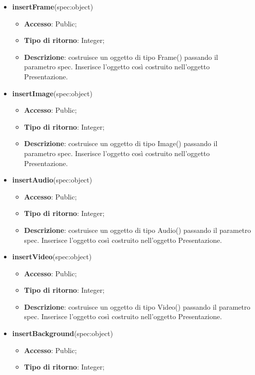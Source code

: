 {\begin{itemize}
\begin{itemize}
			\end{itemize}
			\item \textbf{insertFrame}(spec:object)
			\begin{itemize}
				\item \textbf{Accesso}: Public;
				\item \textbf{Tipo di ritorno}: Integer;
				\item \textbf{Descrizione}: costruisce un oggetto di tipo Frame() passando il parametro spec. Inserisce l’oggetto così costruito nell’oggetto Presentazione.
			\end{itemize}
			\item \textbf{insertImage}(spec:object)
			\begin{itemize}
				\item \textbf{Accesso}: Public;
				\item \textbf{Tipo di ritorno}: Integer;
				\item \textbf{Descrizione}: costruisce un oggetto di tipo Image() passando il parametro spec. Inserisce l’oggetto così costruito nell’oggetto Presentazione.
			\end{itemize}
			\item \textbf{insertAudio}(spec:object)
			\begin{itemize}
				\item \textbf{Accesso}: Public;
				\item \textbf{Tipo di ritorno}: Integer;
				\item \textbf{Descrizione}: costruisce un oggetto di tipo Audio() passando il parametro spec. Inserisce l’oggetto così costruito nell’oggetto Presentazione.
			\end{itemize}
			\item \textbf{insertVideo}(spec:object)
			\begin{itemize}
				\item \textbf{Accesso}: Public;
				\item \textbf{Tipo di ritorno}: Integer;
				\item \textbf{Descrizione}: costruisce un oggetto di tipo Video() passando il parametro spec. Inserisce l’oggetto così costruito nell’oggetto Presentazione.
			\end{itemize}
			\item \textbf{insertBackground}(spec:object)
			\begin{itemize}
				\item \textbf{Accesso}: Public;
				\item \textbf{Tipo di ritorno}: Integer;

\end{itemize}
\end{itemize}}
